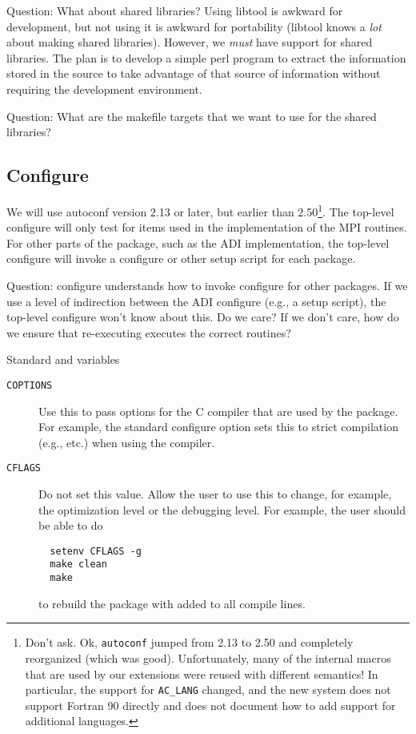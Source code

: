 \documentclass{article}
\begin{document}
Question: What about shared libraries?  Using libtool is awkward for
development, but not using it is awkward for portability (libtool
knows a \emph{lot} about making shared libraries).  However, we
\emph{must} have support for shared libraries.  The plan is to develop
a simple perl program to extract the information stored in the
 source to take advantage of that source of information
without requiring the  development environment.

Question: What are the makefile targets that we want to use for the shared
libraries?

\subsection{Configure}
\label{sec:configure}
We will use autoconf version 2.13 or later, but earlier than
2.50\footnote{Don't ask.  Ok, \texttt{autoconf} jumped from 2.13 to
  2.50 and completely reorganized (which was good).  Unfortunately, many of the
  internal macros that are used by our extensions were reused with
  different semantics!  In particular, the support for
  \texttt{AC_LANG} changed, and the new system does not support
  Fortran 90 directly and does not document how to add support for
  additional languages.}.  The top-level configure will only
test for items used in the implementation of the MPI routines.  For
other parts of the package, such as the ADI implementation, the
top-level configure will invoke a configure or other setup script for
each package.

Question: configure understands how to invoke configure for other
packages.  If we use a level of indirection between the ADI configure
(e.g., a setup script), the top-level configure won't know about
this.  Do we care?  If we don't care, how do we ensure that
re-executing  executes the correct routines?

Standard  and  variables
\begin{description}
\item[\texttt{COPTIONS}]Use this to pass options for the C compiler that are
  used by the package.  For example, the standard configure option
   sets this to strict compilation (e.g.,
   etc.) when using the  compiler.

\item[\texttt{CFLAGS}]Do not set this value.  Allow the user to use this to
  change, for example, the optimization level or the debugging level.  For
  example, the user should be able to do
  \begin{verbatim}
  setenv CFLAGS -g
  make clean
  make
  \end{verbatim}
  to rebuild the package with  added to all compile lines.
\end{description}
\end{document}
